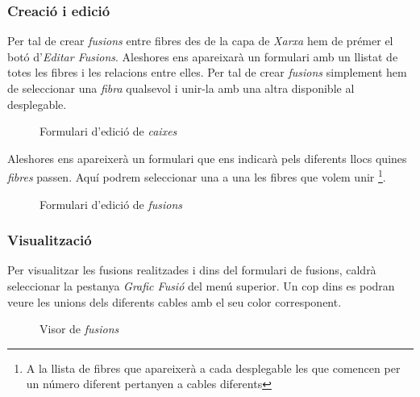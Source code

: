 \documentclass[a4paper]{article}
\begin{document}
	\subsubsection{Creació i edició}
	Per tal de crear \emph{fusions} entre fibres des de la capa de \emph{Xarxa} hem de prémer el botó d'\emph{Editar Fusions}. Aleshores ens apareixarà un formulari amb un llistat de totes les fibres i les relacions entre elles. Per tal de crear \emph{fusions} simplement hem de seleccionar una \emph{fibra} qualsevol i unir-la amb una altra disponible al desplegable.
	
	\begin{figure}[H]
		\centering
		\caption{Formulari d'edició de \emph{caixes}}
	\end{figure}

	Aleshores ens apareixerà un formulari que ens indicarà pels diferents llocs quines \emph{fibres} passen. Aquí podrem seleccionar una a una les fibres que volem unir \footnote{A la llista de fibres que apareixerà a cada desplegable les que comencen per un número diferent pertanyen a cables diferents}.
	
	\begin{figure}[H]
		\centering
		\caption{Formulari d'edició de \emph{fusions}}
	\end{figure}

	\subsubsection{Visualització}
	Per visualitzar les fusions realitzades i dins del formulari de fusions, caldrà seleccionar la pestanya \emph{Grafic Fusió} del menú superior. Un cop dins es podran veure les unions dels diferents cables amb el seu color corresponent.
	
	\begin{figure}[H]
		\centering
		\caption{Visor de \emph{fusions}}
	\end{figure}
\end{document}
